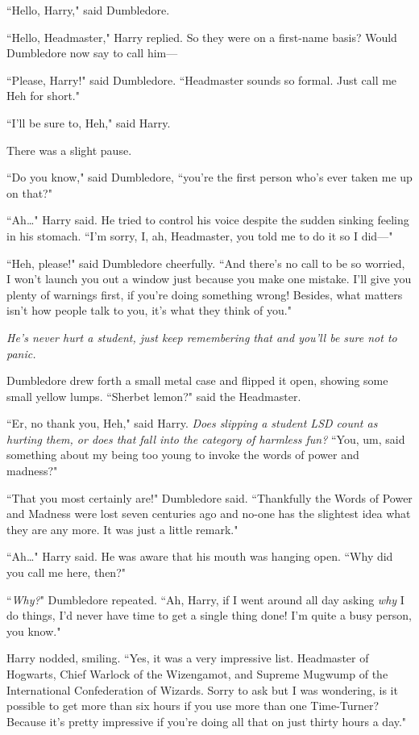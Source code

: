 ``Hello, Harry," said Dumbledore.

``Hello, Headmaster," Harry replied. So they were on a first-name basis? Would Dumbledore now say to call him—

``Please, Harry!" said Dumbledore. ``Headmaster sounds so formal. Just call me Heh for short."

``I'll be sure to, Heh," said Harry.

There was a slight pause.

``Do you know," said Dumbledore, ``you're the first person who's ever taken me up on that?"

``Ah{\ldots}" Harry said. He tried to control his voice despite the sudden sinking feeling in his stomach. ``I'm sorry, I, ah, Headmaster, you told me to do it so I did—"

``Heh, please!" said Dumbledore cheerfully. ``And there's no call to be so worried, I won't launch you out a window just because you make one mistake. I'll give you plenty of warnings first, if you're doing something wrong! Besides, what matters isn't how people talk to you, it's what they think of you."

\emph{He's never hurt a student, just keep remembering that and you'll be sure not to panic.}

Dumbledore drew forth a small metal case and flipped it open, showing some small yellow lumps. ``Sherbet lemon?" said the Headmaster.

``Er, no thank you, Heh," said Harry. \emph{Does slipping a student LSD count as hurting them, or does that fall into the category of harmless fun?} ``You, um, said something about my being too young to invoke the words of power and madness?"

``That you most certainly are!" Dumbledore said. ``Thankfully the Words of Power and Madness were lost seven centuries ago and no-one has the slightest idea what they are any more. It was just a little remark."

``Ah{\ldots}" Harry said. He was aware that his mouth was hanging open. ``Why did you call me here, then?"

``\emph{Why?}" Dumbledore repeated. ``Ah, Harry, if I went around all day asking \emph{why} I do things, I'd never have time to get a single thing done! I'm quite a busy person, you know."

Harry nodded, smiling. ``Yes, it was a very impressive list. Headmaster of Hogwarts, Chief Warlock of the Wizengamot, and Supreme Mugwump of the International Confederation of Wizards. Sorry to ask but I was wondering, is it possible to get more than six hours if you use more than one Time-Turner? Because it's pretty impressive if you're doing all that on just thirty hours a day."

